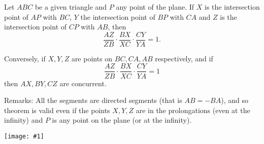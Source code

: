 \documentclass{article}
\newcommand{\figuraex}[2]{\begin{center}\texttt{[image: \#1]}\end{center}}
\begin{document}
Let $ABC$ be a given triangle and $P$ any point of the plane. If $X$ is the intersection point of $AP$ with $BC$, $Y$ the intersection point of $BP$ with $CA$ and $Z$ is the intersection point of $CP$ with $AB$, then
$$\frac{AZ}{ZB}\cdot\frac{BX}{XC}\cdot\frac{CY}{YA}=1.$$

Conversely, if $X,Y,Z$ are points on $BC,CA,AB$ respectively, and if 
$$\frac{AZ}{ZB}\cdot\frac{BX}{XC}\cdot\frac{CY}{YA}=1$$
then $AX,BY,CZ$ are concurrent.

Remarks: All the segments are directed segments (that is $AB=-BA$), and so theorem is valid even if the points $X,Y,Z$ are in the prolongations (even at the infinity) and $P$ is any point on the plane (or at the infinity).

\figuraex{ceva}{scale=0.75}
\end{document}
